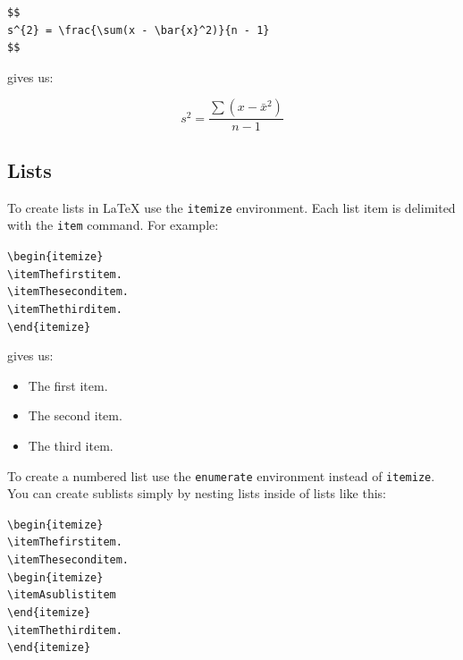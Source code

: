 \begin{knitrout}
\color{fgcolor}\begin{kframe}
\begin{verbatim}
$$
s^{2} = \frac{\sum(x - \bar{x}^2)}{n - 1}
$$
\end{verbatim}
\end{kframe}
\end{knitrout}


\noindent gives us:

$$
s^{2} = \frac{\sum(x - \bar{x}^2)}{n - 1}
$$

\subsection{Lists}

To create lists in LaTeX use the \texttt{itemize} environment. Each list item is delimited with the \texttt{item} command. For example:

\begin{knitrout}
\color{fgcolor}\begin{kframe}
\begin{alltt}
\textbackslash{}begin\{itemize\}
    \textbackslash{}item The first item.
    \textbackslash{}item The second item.
    \textbackslash{}item The third item.
\textbackslash{}end\{itemize\}
\end{alltt}
\end{kframe}
\end{knitrout}


\noindent gives us:

\begin{itemize}
    \item The first item.
    \item The second item.
    \item The third item.
\end{itemize}

\noindent To create a numbered list use the \texttt{enumerate} environment instead of \texttt{itemize}. You can create sublists simply by nesting lists inside of lists like this: 

\begin{knitrout}
\color{fgcolor}\begin{kframe}
\begin{alltt}
\textbackslash{}begin\{itemize\}
    \textbackslash{}item The first item.
    \textbackslash{}item The second item.
    \textbackslash{}begin\{itemize\}
        \textbackslash{}item A sublist item
    \textbackslash{}end\{itemize\}
    \textbackslash{}item The third item.
\textbackslash{}end\{itemize\}
\end{alltt}
\end{kframe}
\end{knitrout}


